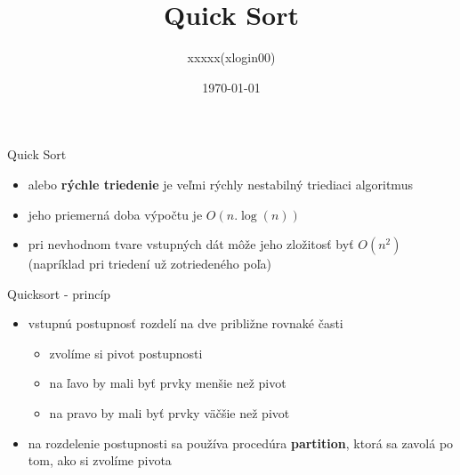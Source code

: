 \documentclass[10pt]{beamer}
\title{Quick Sort}
\author{xxxxx(xlogin00)}
\date{\today}
\begin{document}
\maketitle

\begin{frame}{Quick Sort}
    \begin{itemize}
        \item alebo \textbf{rýchle triedenie} je veľmi rýchly nestabilný triediaci algoritmus
        \item jeho priemerná doba výpočtu je $O(n.\log(n))$ 
        \item pri nevhodnom tvare vstupných dát môže jeho zložitosť byť $O(n^2)$ (napríklad pri triedení už zotriedeného poľa)
    \end{itemize}
\end{frame}

\begin{frame}{Quicksort - princíp}
    \begin{itemize}
        \item vstupnú postupnosť rozdelí na dve približne rovnaké časti
            \begin{itemize}
                \item zvolíme si pivot postupnosti
                \item na ľavo by mali byť prvky menšie než pivot
                \item na pravo by mali byť prvky väčšie než pivot
            \end{itemize} 
        \item na rozdelenie postupnosti sa používa procedúra \textbf{partition}, ktorá sa zavolá po tom, ako si zvolíme pivota
    \end{itemize}
\end{frame}
\end{document}
